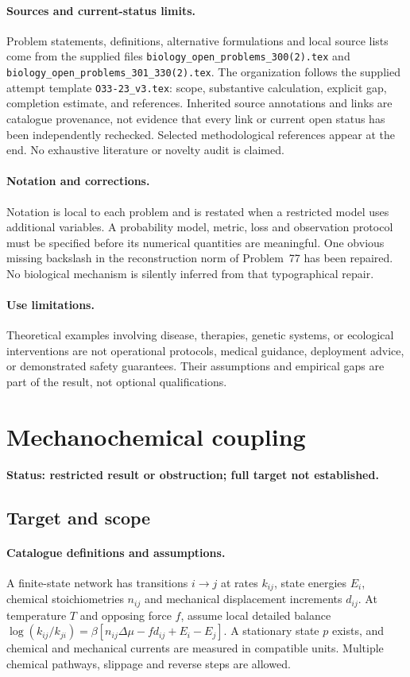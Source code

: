 \documentclass[11pt]{article}
\begin{document}
\paragraph{Sources and current-status limits.}
Problem statements, definitions, alternative formulations and local source lists
come from the supplied files
\texttt{biology\_open\_problems\_300(2).tex} and
\texttt{biology\_open\_problems\_301\_330(2).tex}.
The organization follows the supplied attempt template
\texttt{O33-23\_v3.tex}: scope, substantive calculation, explicit gap,
completion estimate, and references. Inherited source annotations and links are
catalogue provenance, not evidence that every link or current open status has
been independently rechecked. Selected methodological references appear at the
end. No exhaustive literature or novelty audit is claimed.

\paragraph{Notation and corrections.}
Notation is local to each problem and is restated when a restricted model uses
additional variables. A probability model, metric, loss and observation protocol
must be specified before its numerical quantities are meaningful. One obvious
missing backslash in the reconstruction norm of Problem~77 has been repaired.
No biological mechanism is silently inferred from that typographical repair.

\paragraph{Use limitations.}
Theoretical examples involving disease, therapies, genetic systems, or ecological
interventions are not operational protocols, medical guidance, deployment advice,
or demonstrated safety guarantees. Their assumptions and empirical gaps are part
of the result, not optional qualifications.


\section*{Mechanochemical coupling}
\label{prob:094}
\noindent\textbf{Status: restricted result or obstruction; full target not established.}
\subsection{Target and scope}
\paragraph{Catalogue definitions and assumptions.}
A finite-state network has transitions $i\to j$ at rates $k_{ij}$, state energies $E_i$, chemical stoichiometries $n_{ij}$ and mechanical displacement increments $d_{ij}$. At temperature $T$ and opposing force $f$, assume local detailed balance
$\log(k_{ij}/k_{ji})=\beta[n_{ij}\Delta\mu-fd_{ij}+E_i-E_j]$.
A stationary state $p$ exists, and chemical and mechanical currents are measured in compatible units. Multiple chemical pathways, slippage and reverse steps are allowed.
\end{document}
